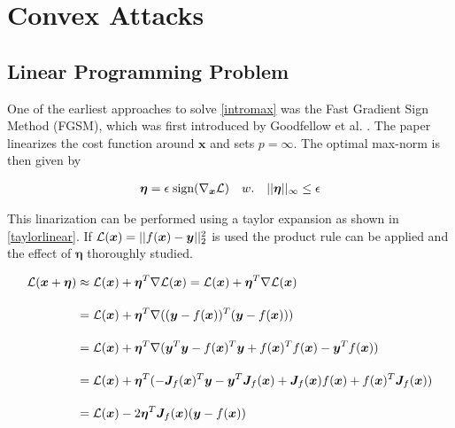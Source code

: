 \section{Convex Attacks}\label{sec:section}

\subsection{Linear Programming Problem}\label{sec:section}

\begingroup
One of the earliest approaches to solve \ref{intromax} was the Fast Gradient Sign Method (FGSM), which was first introduced by Goodfellow et al. \cite{Goodfellow}. The paper
linearizes the cost function around $\bm{x}$ and sets $p=\infty$. The optimal max-norm is then given by
\endgroup

\begin{equation}
\begin{aligned}
	\bm{\eta} = \epsilon \; \text{sign}( \nabla_{\bm{x}} \mathcal{L}) \quad w. \quad \lvert\lvert \bm{\eta} \rvert\rvert_{\infty} \leq \epsilon
\end{aligned}
\label{fastgradientsign}
\end{equation}

\begingroup
This linarization can be performed using a taylor expansion as shown in \ref{taylorlinear}. If $ \mathcal{L}(\bm{x}) = \left\lvert\lvert f(\bm{x}) - \bm{y} \right\rvert\rvert^2_2 $
is used the product rule can be applied and the effect of $\bm{\eta}$ thoroughly studied.
\endgroup

\begin{equation}
\begin{aligned}
	\mathcal{L}(\bm{x} + \bm{\eta}) &\approx \mathcal{L}(\bm{x}) + \bm{\eta}^T \nabla \mathcal{L}(\bm{x}) = \mathcal{L}(\bm{x}) + \bm{\eta}^T \nabla \mathcal{L}(\bm{x}) \\[10pt]
		&= \mathcal{L}(\bm{x}) + \bm{\eta}^T \nabla( (\bm{y} - f(\bm{x}))^T (\bm{y} - f(\bm{x})) ) \\[10pt]
		&= \mathcal{L}(\bm{x}) + \bm{\eta}^T \nabla( \bm{y}^T\bm{y} - f(\bm{x})^T \bm{y} + f(\bm{x})^T f(\bm{x}) - \bm{y}^T f(\bm{x}) ) \\[10pt]
		&= \mathcal{L}(\bm{x}) + \bm{\eta}^T (-\bm{J}_f(\bm{x})^T \bm{y} - \bm{y}^T \bm{J}_f(\bm{x}) + \bm{J}_f(\bm{x}) f(\bm{x}) + f(\bm{x})^T \bm{J}_f(\bm{x})) \\[10pt]
		&= \mathcal{L}(\bm{x}) - 2 \bm{\eta}^T \bm{J}_f(\bm{x}) ( \bm{y} - f(\bm{x}) ) \\
\end{aligned}
\label{taylorlinear}
\end{equation}

